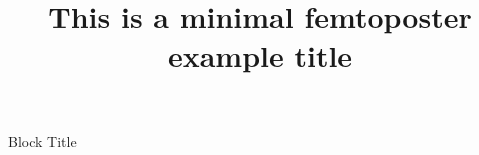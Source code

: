 \documentclass{femtoposter}
\title{This is a minimal femtoposter\\ example title}
\begin{document}

	\begin{block}{Block Title}

	\end{block}

	\secondcolumn

	\begin{block}{}

	\end{block}
\end{document}
